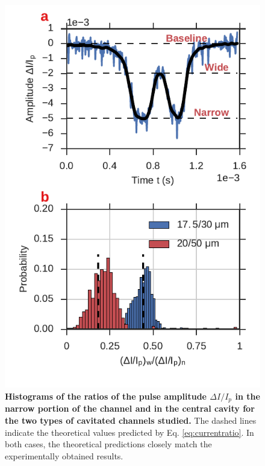 			\begin{figure}
				\includegraphics[width=.5\textwidth]{amplituderatios.pdf}
				\caption{\textbf{Histograms of the ratios of the pulse amplitude $\Delta I/I_{p}$ in the narrow portion of the channel and in the central cavity for the two types of cavitated channels studied.} The dashed lines indicate the theoretical values predicted by Eq. \ref{eq:currentratio}. In both cases, the theoretical predictions closely match the experimentally obtained results.}
				\label{fig:amplituderatios}
			\end{figure}

			
			
			
			
